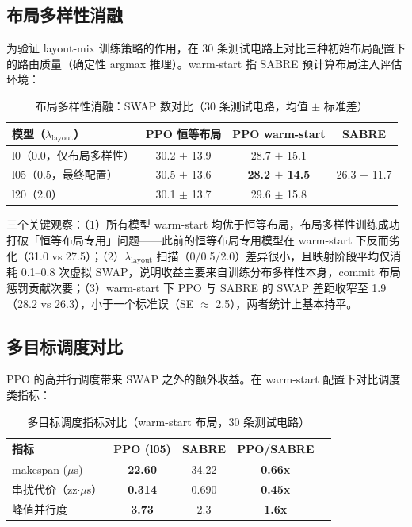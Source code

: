 \subsection{布局多样性消融}
\label{sec:ablation-layout-mix}

为验证 layout-mix 训练策略的作用，在 30 条测试电路上对比三种初始布局配置下的路由质量（确定性 argmax 推理）。warm-start 指 SABRE 预计算布局注入评估环境：

\begin{table}[htbp]
\centering
\caption{布局多样性消融：SWAP 数对比（30 条测试电路，均值 $\pm$ 标准差）}
\label{tab:ablation-layout}
\small
\begin{tabular}{l|ccc}
\hline
模型（$\lambda_{\text{layout}}$） & PPO 恒等布局 & PPO warm-start & SABRE \\
\hline
l0（0.0，仅布局多样性） & 30.2 $\pm$ 13.9 & 28.7 $\pm$ 15.1 & \multirow{3}{*}{26.3 $\pm$ 11.7} \\
l05（0.5，最终配置） & 30.5 $\pm$ 13.6 & \textbf{28.2 $\pm$ 14.5} & \\
l20（2.0） & 30.1 $\pm$ 13.7 & 29.6 $\pm$ 15.8 & \\
\hline
\end{tabular}
\end{table}

三个关键观察：（1）所有模型 warm-start 均优于恒等布局，布局多样性训练成功打破「恒等布局专用」问题——此前的恒等布局专用模型在 warm-start 下反而劣化（31.0 vs 27.5）；（2）$\lambda_{\text{layout}}$ 扫描（0/0.5/2.0）差异很小，且映射阶段平均仅消耗 0.1--0.8 次虚拟 SWAP，说明收益主要来自训练分布多样性本身，commit 布局惩罚贡献次要；（3）warm-start 下 PPO 与 SABRE 的 SWAP 差距收窄至 1.9（28.2 vs 26.3），小于一个标准误（SE $\approx$ 2.5），两者统计上基本持平。

\subsection{多目标调度对比}
\label{sec:multi-objective}

PPO 的高并行调度带来 SWAP 之外的额外收益。在 warm-start 配置下对比调度类指标：

\begin{table}[htbp]
\centering
\caption{多目标调度指标对比（warm-start 布局，30 条测试电路）}
\label{tab:multi-objective}
\small
\begin{tabular}{l|cccc}
\hline
指标 & PPO (l05) & SABRE & PPO/SABRE \\
\hline
makespan ($\mu$s) & \textbf{22.60} & 34.22 & \textbf{0.66x} \\
串扰代价（zz$\cdot\mu$s） & \textbf{0.314} & 0.690 & \textbf{0.45x} \\
峰值并行度 & \textbf{3.73} & 2.3 & \textbf{1.6x} \\
\hline
\end{tabular}
\end{table}

